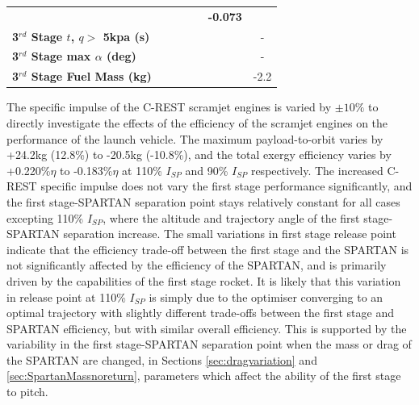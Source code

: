 \begin{table}[ht!]
\begin{tabular}{l c c c c c c}
		& \textbf{\thirddExergyEffIspNinetyFiveNoReturn}
		& \textbf{\thirddExergyEffIspStandardNoReturn}
		& \textbf{\thirddExergyEffIspOneHundredFiveNoReturn}
		& \textbf{\thirddExergyEffIspOneHundredTenNoReturn}
		& \textbf{-0.073}
		\\
		\textbf{3$^{rd}$ Stage $t$, $q >$ 5kpa (s)}
		& \thirdqOverFiveIspNinetyNoReturn
		& \thirdqOverFiveIspNinetyFiveNoReturn
		& \thirdqOverFiveIspStandardNoReturn
		& \thirdqOverFiveIspOneHundredFiveNoReturn
		& \thirdqOverFiveIspOneHundredTenNoReturn
		& -
		\\
		\textbf{3$^{rd}$ Stage max $\alpha$ (deg)}
		& \thirdmaxAoAIspNinetyNoReturn
		& \thirdmaxAoAIspNinetyFiveNoReturn
		& \thirdmaxAoAIspStandardNoReturn
		& \thirdmaxAoAIspOneHundredFiveNoReturn
		& \thirdmaxAoAIspOneHundredTenNoReturn
		& -
		\\
		\textbf{3$^{rd}$ Stage Fuel Mass (kg)}
		& \thirdmFuelIspNinetyNoReturn
		& \thirdmFuelIspNinetyFiveNoReturn
		& \thirdmFuelIspStandardNoReturn
		& \thirdmFuelIspOneHundredFiveNoReturn
		& \thirdmFuelIspOneHundredTenNoReturn
		&-2.2
		\\
		\hline 
	\end{tabular} 
	
\end{table}

The specific impulse of the C-REST scramjet engines is varied by $\pm10\%$ to directly investigate the effects of the efficiency of the scramjet engines on the performance of the launch vehicle. The maximum payload-to-orbit varies by +24.2kg (12.8\%) to -20.5kg (-10.8\%), and the total exergy efficiency varies by +0.220\%$\eta$ to -0.183\%$\eta$ at 110\% $I_{SP}$ and 90\% $I_{SP}$ respectively. 
The increased C-REST specific impulse does not vary the first stage performance significantly, and the first stage-SPARTAN separation point stays relatively constant for all cases excepting 110\% $I_{SP}$, where the altitude and trajectory angle of the first stage-SPARTAN separation increase.   
The small variations in first stage release point indicate that the efficiency trade-off between the first stage and the SPARTAN is not significantly affected by the efficiency of the SPARTAN, and is primarily driven by the capabilities of the first stage rocket. 
It is likely that this variation in release point at 110\% $I_{SP}$ is simply due to the optimiser converging to an optimal trajectory with slightly different trade-offs between the first stage and SPARTAN efficiency, but with similar overall efficiency.
This is supported by the variability in the first stage-SPARTAN separation point when the mass or drag of the SPARTAN are changed, in Sections \ref{sec:dragvariation} and \ref{sec:SpartanMassnoreturn}, parameters which affect the ability of the first stage to pitch. 

